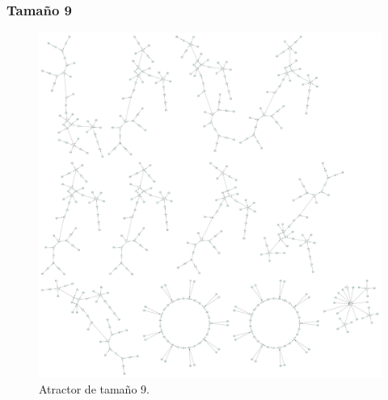 \documentclass[11pt]{article}
\begin{document}
			\subsubsection{Tamaño 9}
			\begin{figure}[H]
			\centering
			\includegraphics[scale=0.1]{resources/Atractores54/atractor_54_size_9.png}
			\caption{Atractor de tamaño 9.}\label{fig:picture}
			\end{figure}
\end{document}
